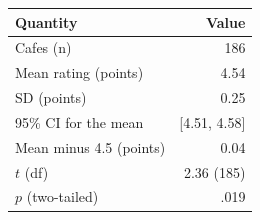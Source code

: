 \begin{tabular}{lr}
\toprule
Quantity & Value \\
\midrule
Cafes (n) & 186 \\
Mean rating (points) & 4.54 \\
SD (points) & 0.25 \\
95\% CI for the mean & [4.51, 4.58] \\
Mean minus 4.5 (points) & 0.04 \\
$t$ (df) & 2.36 (185) \\
$p$ (two-tailed) & .019 \\
\bottomrule
\end{tabular}
